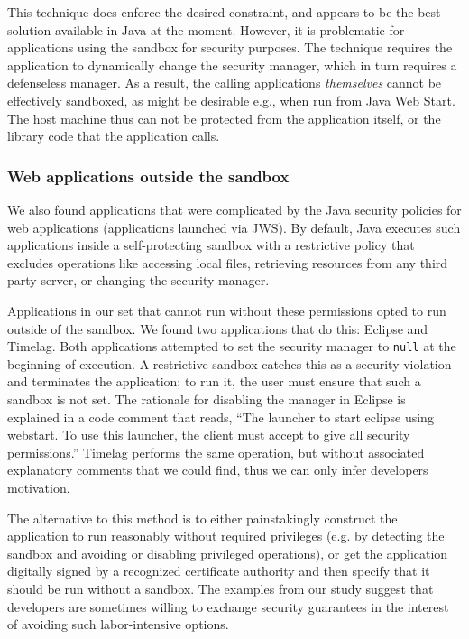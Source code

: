 \documentclass{sig-alternate}
\begin{document}
This technique does enforce the
desired constraint, and appears to be the best solution available
in Java at the moment.  However, it is problematic for applications using the
sandbox for security purposes.  The technique requires 
the application to dynamically change the security manager, which in turn requires a
defenseless manager.  As a result, the calling applications \emph{themselves} cannot be
effectively sandboxed, as might be desirable e.g., when run from Java Web Start.
The host machine thus can not be protected from the application itself, or the
library code that the application calls. 

\subsubsection{Web applications outside the sandbox}\label{sub:Reducing-Web-Application-Complexity}

We also found applications that were complicated by the Java security policies
for web applications (applications launched via JWS). By default,
Java executes such applications inside a self-protecting 
sandbox with a restrictive policy that excludes
operations like accessing local files, retrieving resources
from any third party server, or changing the security manager. 

Applications in our set that cannot run without these permissions
opted to run outside of the sandbox.  
We found two applications that do this: Eclipse and
Timelag.  Both applications attempted
to set the security manager to \texttt{null} at the beginning of execution.
A restrictive sandbox catches this as a security violation and terminates the
application; to run it, the user must ensure that such a sandbox is not set.
The rationale for disabling the manager in Eclipse is explained in a 
code comment that reads, ``The launcher to start eclipse using webstart. To use
this launcher, the client must accept to give all security permissions.'' Timelag
performs the same operation, but without associated explanatory comments that we
could find, thus we can only 
infer developers motivation. 

The alternative to this method is to either painstakingly
construct the application to run reasonably without required privileges (e.g. by
detecting the sandbox and avoiding or disabling privileged operations), or get
the application digitally signed by a recognized certificate authority and
then specify that it should be run without a sandbox.  The examples from our study suggest that
developers are sometimes willing to exchange security guarantees in the interest
of avoiding such labor-intensive options.
\end{document}
